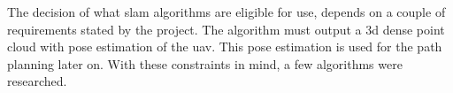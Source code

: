 The decision of what \acs{slam} algorithms are eligible for use, depends on a couple of requirements stated by the project. The algorithm must output a \acs{3d} dense point cloud with pose estimation of the \acs{uav}. This pose estimation is used for the path planning later on. With these constraints in mind, a few algorithms were researched.